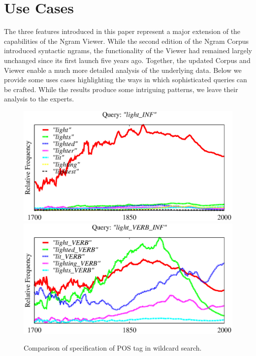 \documentclass[11pt,a4paper]{article}
\begin{document}
\section{Use Cases}
\label{sec:usecases}

The three features introduced in this paper represent a major extension of the capabilities of the Ngram Viewer. While the second edition of the Ngram Corpus \cite{lin2012syntactic} introduced syntactic ngrams, the functionality of the Viewer had remained largely unchanged since its first launch five years ago. Together, the updated Corpus and Viewer enable a much more detailed analysis of the underlying data. Below we provide some uses cases highlighting the ways in which sophisticated queries can be crafted. While the results produce some intriguing patterns, we leave their analysis to the experts.

\begin{figure}[t]
\vspace{-0.1in}
\includegraphics[width=.48\textwidth]{graphs/light_INF}
\includegraphics[width=.48\textwidth]{graphs/light_INF_VERB}
\vspace*{-1em}
\caption{\label{fig:light} Comparison of specification of POS tag in wildcard search.}
\end{figure}
\end{document}
